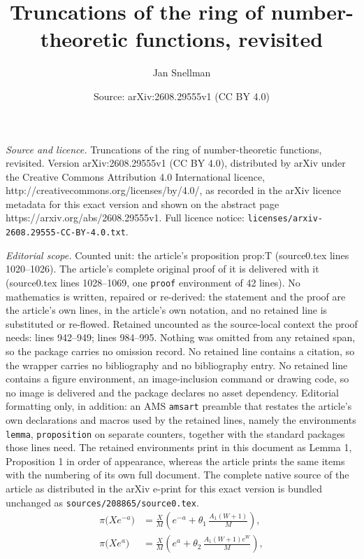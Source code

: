 \documentclass[10pt,a4paper]{amsart}
\title{Truncations of the ring of number-theoretic functions, revisited}
\author{Jan Snellman}
\date{Source: arXiv:2608.29555v1 (CC BY 4.0)}
\begin{document}
\maketitle

\noindent\emph{Source and licence.} Truncations of the ring of number-theoretic functions, revisited. Version arXiv:2608.29555v1 (CC BY 4.0), distributed by arXiv under the Creative Commons Attribution 4.0 International licence, http://creativecommons.org/licenses/by/4.0/, as recorded in the arXiv licence metadata for this exact version and shown on the abstract page https://arxiv.org/abs/2608.29555v1. Full licence notice: \texttt{licenses/arxiv-2608.29555-CC-BY-4.0.txt}.\par\smallskip

\noindent\textit{Editorial scope.} Counted unit: the article's proposition prop:T (source0.tex lines 1020--1026). The article's complete original proof of it is delivered with it (source0.tex lines 1028--1069, one \texttt{proof} environment of 42 lines). No mathematics is written, repaired or re-derived: the statement and the proof are the article's own lines, in the article's own notation, and no retained line is substituted or re-flowed.  Retained uncounted as the source-local context the proof needs: lines 942--949; lines 984--995.  Nothing was omitted from any retained span, so the package carries no omission record.  No retained line contains a citation, so the wrapper carries no bibliography and no bibliography entry.  No retained line contains a figure environment, an image-inclusion command or drawing code, so no image is delivered and the package declares no asset dependency.  Editorial formatting only, in addition: an AMS \texttt{amsart} preamble that restates the article's own declarations and macros used by the retained lines, namely the environments \texttt{lemma}, \texttt{proposition} on separate counters, together with the standard packages those lines need.  The retained environments print in this document as Lemma 1, Proposition 1 in order of appearance, whereas the article prints the same items with the numbering of its own full document.  The complete native source of the article as distributed in the arXiv e-print for this exact version is bundled unchanged as \texttt{sources/208865/source0.tex}.
  \begin{equation}\label{eq:pnt-sub}
    \begin{aligned}
      \pi\bigl(Xe^{-a}\bigr)
        &= \frac{X}{M}\left(e^{-a}+\theta_1\,\frac{A_1(W+1)}{M}\right),\\
      \pi\bigl(Xe^{a}\bigr)
        &= \frac{X}{M}\left(e^{a}+\theta_2\,\frac{A_1(W+1)e^{W}}{M}\right),
    \end{aligned}
  \end{equation}
\end{document}

